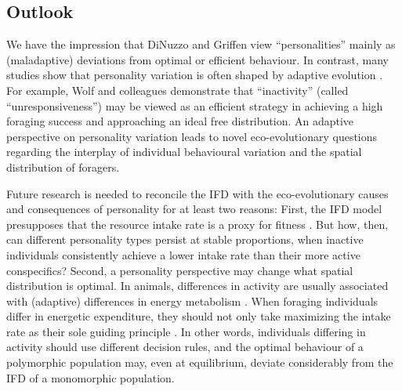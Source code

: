 \begin{interludeenv}
	\subsection*{Outlook}
	
	We have the impression that DiNuzzo and Griffen view ``personalities'' mainly as (maladaptive) deviations from optimal or efficient behaviour. In contrast, many studies show that personality variation is often shaped by adaptive evolution .
	For example, Wolf and colleagues demonstrate that “inactivity” (called ``unresponsiveness'') may be viewed as an efficient strategy in achieving a high foraging success and approaching an ideal free distribution.
	An adaptive perspective on personality variation leads to novel eco-evolutionary questions regarding the interplay of individual behavioural variation and the spatial distribution of foragers.

	Future research is needed to reconcile the IFD with the eco-evolutionary causes and consequences of personality for at least two reasons: First, the IFD model presupposes that the resource intake rate is a proxy for fitness .
	But how, then, can different personality types persist at stable proportions, when inactive individuals consistently achieve a lower intake rate than their more active conspecifics? 
	Second, a personality perspective may change what spatial distribution is optimal.
	In animals, differences in activity are usually associated with (adaptive) differences in energy metabolism .
	When foraging individuals differ in energetic expenditure, they should not only take maximizing the intake rate as their sole guiding principle .
	In other words, individuals differing in activity should use different decision rules, and the optimal behaviour of a polymorphic population may, even at equilibrium, deviate considerably from the IFD of a monomorphic population.

	{ \begin{center}  \end{center} }

\end{interludeenv}
\endgroup


\begingroup

